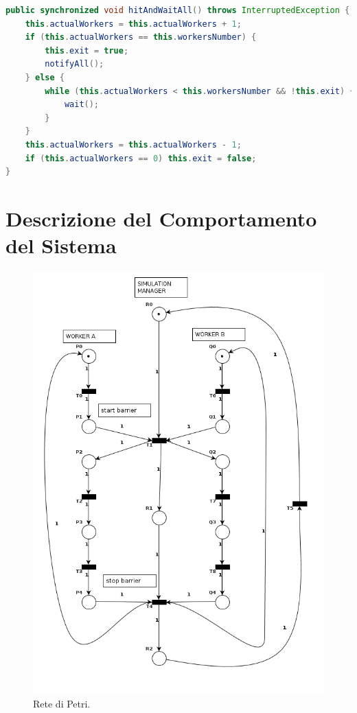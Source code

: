 \documentclass[12pt,a4paper,openright,twoside]{book}
\begin{document}
\begin{lstlisting}[float,
					language=Java,
					label=lst:lst3,caption=Implementazione della barrier]
public synchronized void hitAndWaitAll() throws InterruptedException {
	this.actualWorkers = this.actualWorkers + 1;
	if (this.actualWorkers == this.workersNumber) {
		this.exit = true;
		notifyAll();
	} else {
		while (this.actualWorkers < this.workersNumber && !this.exit) {
			wait();
		}
	}
	this.actualWorkers = this.actualWorkers - 1;
	if (this.actualWorkers == 0) this.exit = false;
}
\end{lstlisting}

\chapter{Descrizione del Comportamento del Sistema} %
\label{chap:Descrizione del Comportamento del Sistema}

\begin{figure}
	\centering
	\includegraphics[width=0.9\linewidth]{figures/petri-net.png}
	\caption{Rete di Petri.}
	\label{fig:petri-net}
\end{figure}
\end{document}
